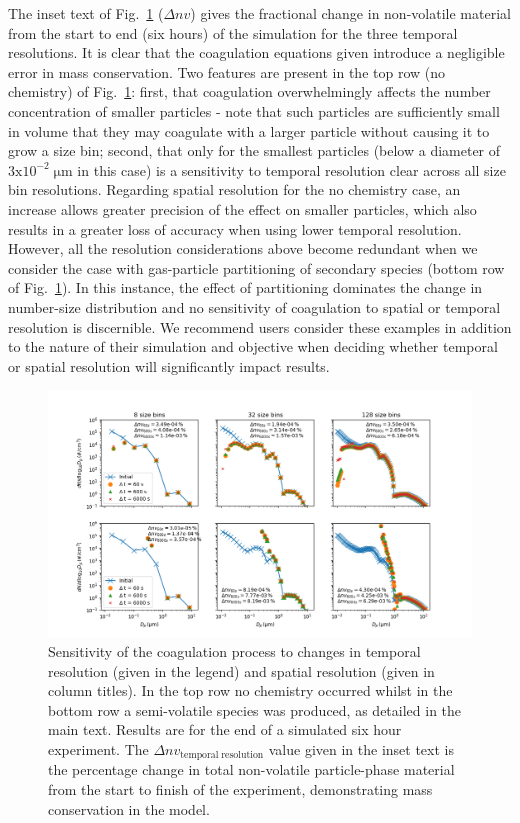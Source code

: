 \documentclass[gmd, manuscript]{copernicus}
\begin{document}
The inset text of Fig.~\ref{fig:coag_resol_test_plot} ($\Delta nv$) gives the fractional change in non-volatile material from the start to end (six hours) of the simulation for the three temporal resolutions.  It is clear that the coagulation equations given introduce a negligible error in mass conservation.  Two features are present in the top row (no chemistry) of Fig.~\ref{fig:coag_resol_test_plot}: first, that coagulation overwhelmingly affects the number concentration of smaller particles - note that such particles are sufficiently small in volume that they may coagulate with a larger particle without causing it to grow a size bin; second, that only for the smallest particles (below a diameter of $\mathrm{3x10^{-2}\; \mu m}$ in this case) is a sensitivity to temporal resolution clear across all size bin resolutions.  Regarding spatial resolution for the no chemistry case, an increase allows greater precision of the effect on smaller particles, which also results in a greater loss of accuracy when using lower temporal resolution.  However, all the resolution considerations above become redundant when we consider the case with gas-particle partitioning of secondary species (bottom row of Fig.~\ref{fig:coag_resol_test_plot}).  In this instance, the effect of partitioning dominates the change in number-size distribution and no sensitivity of coagulation to spatial or temporal resolution is discernible.  We recommend users consider these examples in addition to the nature of their simulation and objective when deciding whether temporal or spatial resolution will significantly impact results.

\begin{figure}[t]
\includegraphics[width=12.0cm]{Results/coag_resol_test_plot.png}
\caption{Sensitivity of the coagulation process to changes in temporal resolution (given in the legend) and spatial resolution (given in column titles).  In the top row no chemistry occurred whilst in the bottom row a semi-volatile species was produced, as detailed in the main text.  Results are for the end of a simulated six hour experiment.  The $\Delta nv_{\mathrm{temporal\; resolution}}$ value given in the inset text is the percentage change in total non-volatile particle-phase material from the start to finish of the experiment, demonstrating mass conservation in the model.}
\label{fig:coag_resol_test_plot}
\end{figure}
\end{document}
